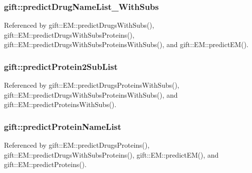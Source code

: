 \subsubsection[{\texorpdfstring{predict\+Drug\+Name\+List\+\_\+\+With\+Subs}{predictDrugNameList\_WithSubs}}]{ gift\+::predict\+Drug\+Name\+List\+\_\+\+With\+Subs}\hypertarget{namespacegift_a85bd1982c5b60a7cf09a0f80398bb051}{}\label{namespacegift_a85bd1982c5b60a7cf09a0f80398bb051}


Referenced by gift\+::\+E\+M\+::predict\+Drugs\+With\+Subs(), gift\+::\+E\+M\+::predict\+Drugs\+With\+Subs\+Proteins(), gift\+::\+E\+M\+::predict\+Drugs\+With\+Subs\+Proteins\+With\+Subs(), and gift\+::\+E\+M\+::predict\+E\+M().

\subsubsection[{\texorpdfstring{predict\+Protein2\+Sub\+List}{predictProtein2SubList}}]{ gift\+::predict\+Protein2\+Sub\+List}\hypertarget{namespacegift_a4899f631bc8342759f4096e7b653eed8}{}\label{namespacegift_a4899f631bc8342759f4096e7b653eed8}


Referenced by gift\+::\+E\+M\+::predict\+Drugs\+Proteins\+With\+Subs(), gift\+::\+E\+M\+::predict\+Drugs\+With\+Subs\+Proteins\+With\+Subs(), and gift\+::\+E\+M\+::predict\+Proteins\+With\+Subs().

\subsubsection[{\texorpdfstring{predict\+Protein\+Name\+List}{predictProteinNameList}}]{ gift\+::predict\+Protein\+Name\+List}\hypertarget{namespacegift_a03bb78fc438e2b1af29ff3b46b70a085}{}\label{namespacegift_a03bb78fc438e2b1af29ff3b46b70a085}


Referenced by gift\+::\+E\+M\+::predict\+Drugs\+Proteins(), gift\+::\+E\+M\+::predict\+Drugs\+With\+Subs\+Proteins(), gift\+::\+E\+M\+::predict\+E\+M(), and gift\+::\+E\+M\+::predict\+Proteins().

